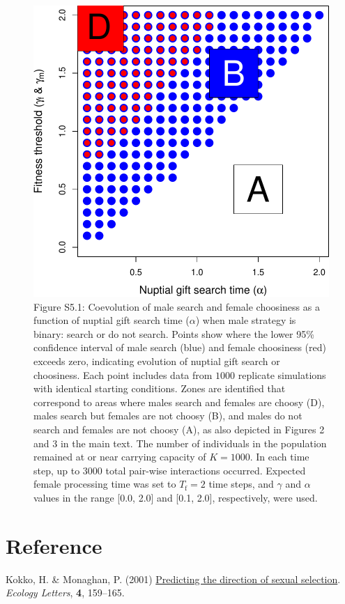 \documentclass[
]{article}
\newlength{\cslhangindent}
\newlength{\cslentryspacingunit} %
\newenvironment{CSLReferences}[2] %
 {%
  \setlength{\parindent}{0pt}
  \ifodd #1
  \let\oldpar\par
  \def\par{\hangindent=\cslhangindent\oldpar}
  \fi
  \setlength{\parskip}{#2\cslentryspacingunit}
 }%
 {}
\begin{document}
\begin{figure}
\centering
\includegraphics{SI_files/figure-latex/unnamed-chunk-10-1.pdf}
\caption{Figure S5.1: Coevolution of male search and female choosiness
as a function of nuptial gift search time (\(\alpha\)) when male
strategy is binary: search or do not search. Points show where the lower
95\% confidence interval of male search (blue) and female choosiness
(red) exceeds zero, indicating evolution of nuptial gift search or
choosiness. Each point includes data from \(1000\) replicate simulations
with identical starting conditions. Zones are identified that correspond
to areas where males search and females are choosy (D), males search but
females are not choosy (B), and males do not search and females are not
choosy (A), as also depicted in Figures 2 and 3 in the main text. The
number of individuals in the population remained at or near carrying
capacity of \(K = 1000\). In each time step, up to 3000 total pair-wise
interactions occurred. Expected female processing time was set to
\(T_{\mathrm{f}}=2\) time steps, and \(\gamma\) and \(\alpha\) values in
the range {[}0.0, 2.0{]} and {[}0.1, 2.0{]}, respectively, were used.}
\end{figure}

\captionsetup{labelformat=default}

\clearpage

\hypertarget{reference}{%
\section*{Reference}\label{reference}}

\hypertarget{refs}{}
\begin{CSLReferences}{0}{0}
\leavevmode{}%
Kokko, H. \& Monaghan, P. (2001)
\href{https://doi.org/10.1046/j.1461-0248.2001.00212.x}{{Predicting the
direction of sexual selection}}. \emph{Ecology Letters}, \textbf{4},
159--165.

\end{CSLReferences}
\end{document}

